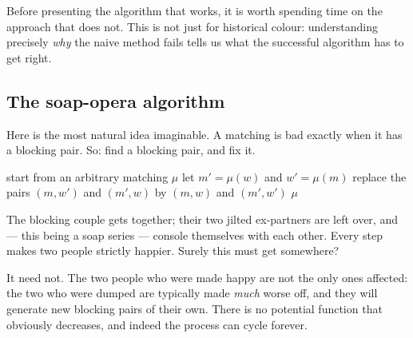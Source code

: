Before presenting the algorithm that works, it is worth spending time on the
approach that does not. This is not just for historical colour: understanding
precisely \emph{why} the naive method fails tells us what the successful
algorithm has to get right.

\subsection{The soap-opera algorithm}

Here is the most natural idea imaginable. A matching is bad exactly when it
has a blocking pair. So: find a blocking pair, and fix it.

\begin{algorithm}[ht]
\caption{Greedy repair (the ``soap series'' algorithm)}
\label{alg:sm-greedy}
\begin{algorithmic}[1]
  \State start from an arbitrary matching $\mu$
    \State let $m' = \mu(w)$ and $w' = \mu(m)$
    \State replace the pairs $(m,w')$ and $(m',w)$ by $(m,w)$ and $(m',w')$
  \EndWhile
  \State \Return $\mu$
\end{algorithmic}
\end{algorithm}

The blocking couple gets together; their two jilted ex-partners are left over,
and --- this being a soap series --- console themselves with each other. Every
step makes two people strictly happier. Surely this must get somewhere?

It need not. The two people who were made happy are not the only ones affected:
the two who were dumped are typically made \emph{much} worse off, and they will
generate new blocking pairs of their own. There is no potential function that
obviously decreases, and indeed the process can cycle forever.

